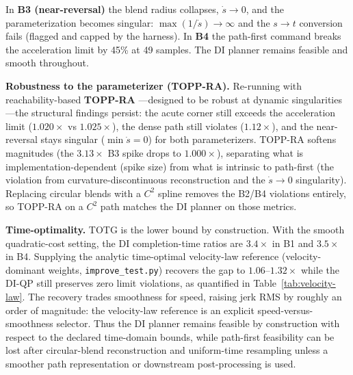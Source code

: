 In \textbf{B3 (near-reversal)} the blend radius collapses,
\(\dot s\to 0\), and the parameterization becomes singular:
\(\max(1/\dot s)\to\infty\) and the \(s\!\to\!t\) conversion fails
(flagged and capped by the harness). In \textbf{B4} the path-first
command breaks the acceleration limit by 45\% at 49 samples. The DI
planner remains feasible and smooth throughout.

\textbf{Robustness to the parameterizer (TOPP-RA).} Re-running with
reachability-based \textbf{TOPP-RA} \cite{toppra}---designed to be robust
at dynamic singularities---the structural findings persist: the acute
corner still exceeds the acceleration limit (\(1.020\times\) vs
\(1.025\times\)), the dense path still violates (\(1.12\times\)), and the
near-reversal stays singular (\(\min\dot s = 0\)) for both parameterizers.
TOPP-RA softens magnitudes (the \(3.13\times\) B3 spike drops to
\(1.000\times\)), separating what is implementation-dependent (spike size)
from what is intrinsic to path-first (the violation from
curvature-discontinuous reconstruction and the \(\dot s\to0\) singularity).
Replacing circular blends with a \(C^2\) spline removes the B2/B4
violations entirely, so TOPP-RA on a \(C^2\) path matches the DI planner
on those metrics.

\textbf{Time-optimality.} TOTG is the lower bound by construction. With
the smooth quadratic-cost setting, the DI completion-time ratios are
\(3.4\times\) in B1 and \(3.5\times\) in B4. Supplying the analytic
time-optimal velocity-law reference (velocity-dominant weights,
\texttt{improve\_test.py}) recovers the gap to \(1.06\)--\(1.32\times\)
while the DI-QP still preserves zero limit violations, as quantified in
Table~\ref{tab:velocity-law}. The recovery trades
smoothness for speed, raising jerk RMS by roughly an order of magnitude:
the velocity-law reference is an explicit speed-versus-smoothness
selector. Thus the DI planner
remains feasible by construction with respect to the declared time-domain
bounds, while path-first feasibility can be lost after circular-blend
reconstruction and uniform-time resampling unless a smoother path
representation or downstream post-processing is used.

